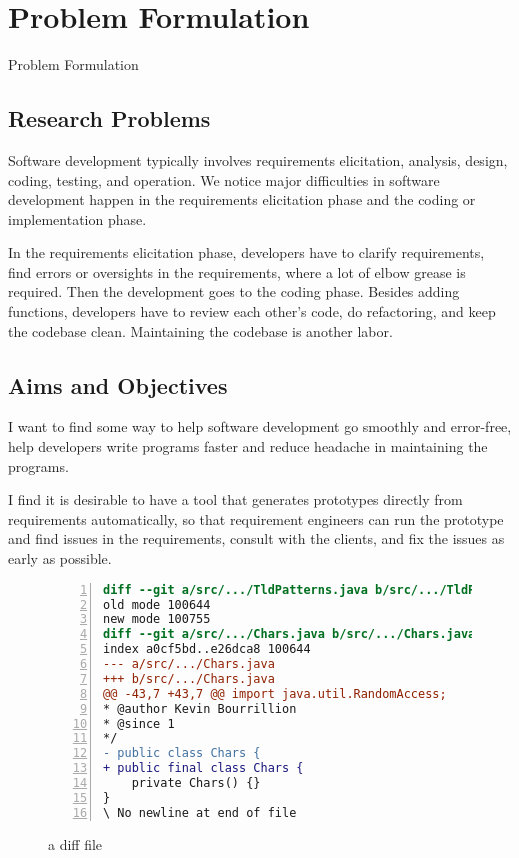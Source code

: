 \chapter{Problem Formulation}

Problem Formulation


\section{Research Problems}


Software development typically involves requirements elicitation, analysis, design, coding, testing, and operation. We notice major difficulties in software development happen in the requirements elicitation phase and the coding or implementation phase.

In the requirements elicitation phase, developers have to clarify requirements, find errors or oversights in the requirements, where a lot of elbow grease is required. Then the development goes to the coding phase. Besides adding functions, developers have to review each other's code, do refactoring, and keep the codebase clean. Maintaining the codebase is another labor.



\section{Aims and Objectives}

I want to find some way to help software development go smoothly and error-free, help developers write programs faster and reduce headache in maintaining the programs.

I find it is desirable to have a tool that generates prototypes directly from requirements automatically, so that requirement engineers can run the prototype and find issues in the requirements, consult with the clients, and fix the issues as early as possible.


\begin{figure}[ht]
\begin{lstlisting}[language=diff, breaklines=true, numbers=left, xleftmargin=2em]
diff --git a/src/.../TldPatterns.java b/src/.../TldPatterns.java
old mode 100644
new mode 100755
diff --git a/src/.../Chars.java b/src/.../Chars.java
index a0cf5bd..e26dca8 100644
--- a/src/.../Chars.java
+++ b/src/.../Chars.java
@@ -43,7 +43,7 @@ import java.util.RandomAccess;
* @author Kevin Bourrillion
* @since 1
*/
- public class Chars {
+ public final class Chars {
	private Chars() {}
}
\ No newline at end of file
\end{lstlisting}
\caption{a diff file}
\label{fig:example-diff}
\end{figure}

